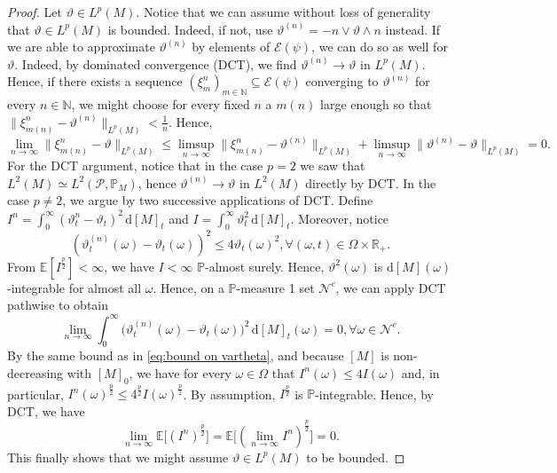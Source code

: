 \documentclass[11pt,a4paper,twoside,openany]{report}
\numberwithin{equation}{section}
\newcommand{\diff}{\mathrm{d}}
\theoremstyle{plain} %
\theoremstyle{definition} %
\theoremstyle{remark} %
\begin{document}
\begin{proof}
Let \(\vartheta\in L^p(M)\). Notice that we can assume without loss of generality that \(\vartheta\in L^p(M)\) is bounded. Indeed, if not, use \(\vartheta^{(n)}=-n\vee \vartheta\wedge n\) instead. If we are able to approximate \(\vartheta^{(n)}\) by elements of \(\mathcal{E}(\psi)\), we can do so as well for \(\vartheta\). Indeed, by dominated convergence (DCT), we find \(\vartheta^{(n)}\to \vartheta\) in \(L^p(M)\). Hence, if there exists a sequence \((\xi^n_m)_{m\in\mathbb{N}}\subseteq \mathcal{E}(\psi)\) converging to \(\vartheta^{(n)}\) for every \(n\in\mathbb{N}\), we might choose for every fixed \(n\) a \(m(n)\) large enough so that \(\lVert \xi^n_{m(n)}-\vartheta^{(n)}\rVert_{L^p(M)}<\frac{1}{n}\). Hence, 
\begin{equation*}
    \lim_{n\to\infty}\lVert\xi^n_{m(n)}-\vartheta\rVert_{L^p(M)}\leq\limsup_{n\to\infty}\lVert\xi^n_{m(n)}-\vartheta^{(n)}\rVert_{L^p(M)}+\limsup_{n\to\infty}\lVert\vartheta^{(n)}-\vartheta\rVert_{L^p(M)}=0.
\end{equation*}
For the DCT argument, notice that in the case \(p=2\) we saw that \(L^2(M)\simeq L^2(\mathcal{P},\mathbb{P}_M)\), hence \(\vartheta^{(n)}\to\vartheta\) in \(L^2(M)\) directly by DCT. In the case \(p\neq 2\), we argue by two successive applications of DCT.
 Define \(I^n=\int_0^{\infty}(\vartheta^n_t-\vartheta_t)^2\,\diff[M]_t\) and \(I=\int_0^{\infty}\vartheta_t^2\,\diff[M]_t\). Moreover, notice
 \begin{equation}\label{eq:bound on vartheta}
     (\vartheta_t^{(n)}(\omega)-\vartheta_t(\omega))^2\leq 4\vartheta_t(\omega)^2,\forall(\omega,t)\in\Omega\times\mathbb{R}_+.
 \end{equation}
 From \(\mathbb{E}[I^{\frac{p}{2}}]<\infty\), we have \(I<\infty\) \(\mathbb{P}\)-almost surely. Hence, \(\vartheta^2(\omega)\) is \(\diff [M](\omega)\)-integrable for almost all \(\omega\). Hence, on a \(\mathbb{P}\)-measure 1 set \(\mathcal{N}^c\), we can apply DCT pathwise to obtain
 \begin{equation*}
     \lim_{n\to\infty}\int_0^{\infty}\Big(\vartheta^{(n)}_t(\omega)-\vartheta_t(\omega)\Big)^2\,\diff [M]_t(\omega)=0,\forall\omega\in \mathcal{N}^c.
 \end{equation*}
 By the same bound as in \eqref{eq:bound on vartheta}, and because \([M]\) is non-decreasing with \([M]_0\), we have for every \(\omega\in\Omega\) that \(I^n(\omega)\leq 4 I(\omega)\) and, in particular, \(I^n(\omega)^{\frac{p}{2}}\leq 4^{\frac{p}{2}} I(\omega)^{\frac{p}{2}}\).  By assumption, \(I^{\frac{p}{2}}\) is \(\mathbb{P}\)-integrable. Hence, by DCT, we have 
 \begin{equation*}
  \lim_{n\to\infty}\mathbb{E}\Big[(I^n)^{\frac{p}{2}}\Big]=\mathbb{E}\Big[(\lim_{n\to\infty}I^n)^{\frac{p}{2}}\Big]=0.
 \end{equation*} 
 This finally shows that we might assume \(\vartheta\in L^p(M)\) to be bounded.




\end{proof}
\end{document}
